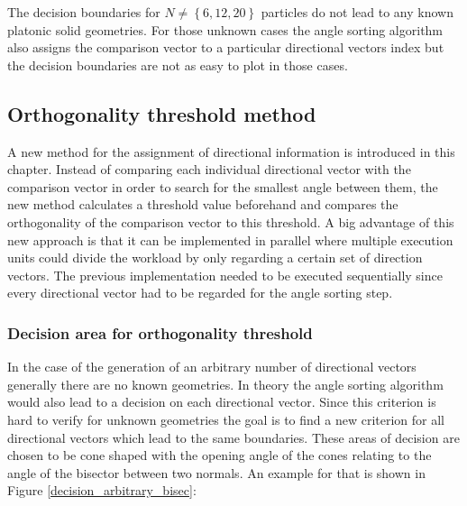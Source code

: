 The decision boundaries for $N \neq \left \{ 6,12,20 \right \}$ particles do not lead to any known platonic solid geometries. For those unknown cases the angle sorting algorithm also assigns the comparison vector to a particular directional vectors index but the decision boundaries are not as easy to plot in those cases.














\subsection{Orthogonality threshold method}
\label{chap:ortho_threshold}

A new method for the assignment of directional information is introduced in this chapter. Instead of comparing each individual directional vector with the comparison vector in order to search for the smallest angle between them, the new method calculates a threshold value beforehand and compares the orthogonality of the comparison vector to this threshold. A big advantage of this new approach is that it can be implemented in parallel where multiple execution units could divide the workload by only regarding a certain set of direction vectors. The previous implementation needed to be executed sequentially since every directional vector had to be regarded for the angle sorting step. 






\subsubsection{Decision area for orthogonality threshold}
\label{decison_orthonolatiy}

In the case of the generation of an arbitrary number of directional vectors generally there are no known geometries. In theory the angle sorting algorithm would also lead to a decision on each directional vector. Since this criterion is hard to verify for unknown geometries the goal is to find a new criterion for all directional vectors which lead to the same boundaries. These areas of decision are chosen to be cone shaped with the opening angle of the cones relating to the angle of the bisector between two normals. An example for that is shown in Figure \ref{decision_arbitrary_bisec}:


